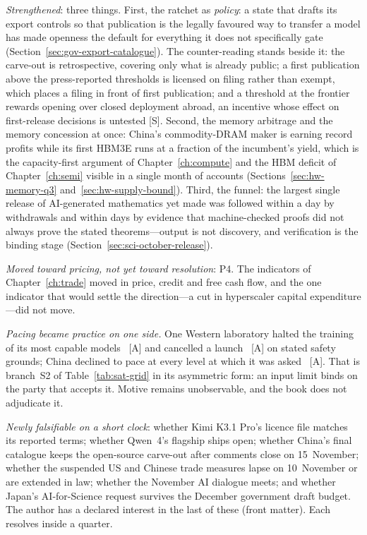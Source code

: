 \emph{Strengthened}: three things. First, the ratchet as \emph{policy}: a state that drafts its export controls so that publication is the legally favoured way to transfer a model has made openness the default for everything it does not specifically gate (Section~\ref{sec:gov-export-catalogue}). The counter-reading stands beside it: the carve-out is retrospective, covering only what is already public; a first publication above the press-reported thresholds is licensed on filing rather than exempt, which places a filing in front of first publication; and a threshold at the frontier rewards opening over closed deployment abroad, an incentive whose effect on first-release decisions is untested [S]. Second, the memory arbitrage and the memory concession at once: China's commodity-DRAM maker is earning record profits while its first HBM3E runs at a fraction of the incumbent's yield, which is the capacity-first argument of Chapter~\ref{ch:compute} and the HBM deficit of Chapter~\ref{ch:semi} visible in a single month of accounts (Sections~\ref{sec:hw-memory-q3} and~\ref{sec:hw-supply-bound}). Third, the funnel: the largest single release of AI-generated mathematics yet made was followed within a day by withdrawals and within days by evidence that machine-checked proofs did not always prove the stated theorems---output is not discovery, and verification is the binding stage (Section~\ref{sec:sci-october-release}).

\emph{Moved toward pricing, not yet toward resolution}: P4. The indicators of Chapter~\ref{ch:trade} moved in price, credit and free cash flow, and the one indicator that would settle the direction---a cut in hyperscaler capital expenditure---did not move.

\emph{Pacing became practice on one side.} One Western laboratory halted the training of its most capable models~\cite{mdl-openai-pause2} [A] and cancelled a launch~\cite{mdl-gpt61-astra-cancel} [A] on stated safety grounds; China declined to pace at every level at which it was asked~\cite{mdl-china-rejects-pacing} [A]. That is branch~S2 of Table~\ref{tab:sat-grid} in its asymmetric form: an input limit binds on the party that accepts it. Motive remains unobservable, and the book does not adjudicate it.

\emph{Newly falsifiable on a short clock}: whether Kimi K3.1 Pro's licence file matches its reported terms; whether Qwen~4's flagship ships open; whether China's final catalogue keeps the open-source carve-out after comments close on 15~November; whether the suspended US and Chinese trade measures lapse on 10~November or are extended in law; whether the November AI dialogue meets; and whether Japan's AI-for-Science request survives the December government draft budget. The author has a declared interest in the last of these (front matter). Each resolves inside a quarter.

